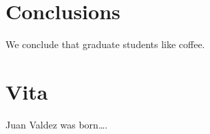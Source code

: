 \documentclass[edeposit,fullpage]{uiucthesis2009}
\begin{document}





\chapter{Conclusions}

We conclude that graduate students like coffee.

\appendix*



\backmatter



\chapter{Vita}

Juan Valdez was born\ldots.
\end{document}
